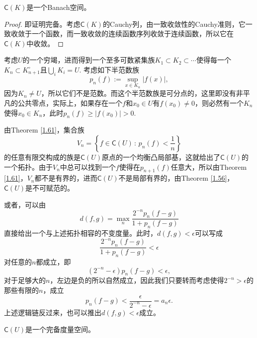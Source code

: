 \begin{pro}
$\mathsf{C}(K)$是一个Banach空间。
\end{pro}

\begin{proof}
即证明完备。考虑$\mathsf{C}(K)$的Cauchy列，由一致收敛性的Cauchy准则，它一致收敛于一个函数，而一致收敛的连续函数序列收敛于连续函数，所以它在$\mathsf{C}(K)$中收敛。
\end{proof}

\begin{para}
考虑$U$的一个穷竭，进而得到一个至多可数紧集族$K_1\subset K_2\subset \cdots$使得每一个$K_n\subset K_{n+1}^\circ$且$\bigcup_i K_i=U$. 考虑如下半范数族
\[
	p_n(f):=\sup_{x\in K_n}|f(x)|,
\]
因为$K_n\neq U$，所以它们不是范数。而这个半范数族是可分点的，这里即没有非平凡的公共零点，实际上，如果存在一个$f$和$x_0\in U$有$f(x_0)\neq 0$，则必然有一个$K_n$使得$x_0\in K_n$，此时$p_n(f)\geq |f(x_0)|>0$.

由Theorem \ref{1.61}，集合族
\[
	V_n=\left\{f\in \mathsf{C}(U)\,:\, p_n(f)< \frac 1 n\right\}
\]
的任意有限交构成的族是$\mathsf{C}(U)$原点的一个均衡凸局部基，这就给出了$\mathsf{C}(U)$的一个拓扑。由于$V_n$中总可以找到一个$f$使得在$p_{n+1}(f)$任意大，所以由Theorem \ref{1.61}，$V_n$都不是有界的，进而$\mathsf{C}(U)$不是局部有界的，由Theorem \ref{1.56}，$\mathsf{C}(U)$是不可赋范的。

或者，可以由
\[
	d(f,g)=\max_n \frac{2^{-n}p_n(f-g)}{1+p_n(f-g)}
\]
直接给出一个与上述拓扑相容的不变度量。此时，$d(f,g)<\epsilon$可以写成
\[
	\frac{2^{-n}p_n(f-g)}{1+p_n(f-g)}<\epsilon
\]
对任意的$n$都成立，即
\[
	(2^{-n}-\epsilon)p_n(f-g)<\epsilon,
\]
对于足够大的$n$，左边是负的所以自然成立，因此我们只要转而考虑使得$2^{-n}>\epsilon$的那些有限的$n$，成立
\[
	p_n(f-g)<\frac{\epsilon}{2^{-n}-\epsilon}=a_n \epsilon.
\]
上述逻辑链反过来，也可以推出$d(f,g)<\epsilon$成立。
\end{para}

\begin{pro}
$\mathsf{C}(U)$是一个完备度量空间。
\end{pro}

